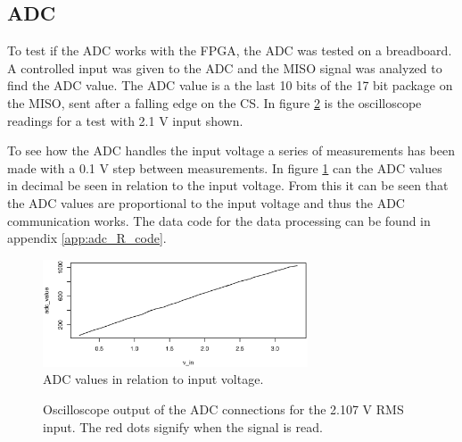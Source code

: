 \subsection{ADC}
To test if the ADC works with the FPGA, the ADC was tested on a breadboard.
A controlled input was given to the ADC and the MISO signal was analyzed to find the ADC value.
The ADC value is a the last 10 bits of the 17 bit package on the MISO, sent after a falling edge on the CS.
In figure \ref{fig:scope_adc} is the oscilloscope readings for a test with 2.1 V input shown.

To see how the ADC handles the input voltage a series of measurements has been made with a 0.1 V step between measurements.
In figure \ref{fig:adc_values} can the ADC values in decimal be seen in relation to the input voltage.
From this it can be seen that the ADC values are proportional to the input voltage and thus the ADC communication works.
The data code for the data processing can be found in appendix \ref{app:adc_R_code}.

\begin{figure}[h]
 \centering
 \includegraphics[width=0.7\textwidth]{img/ADC_values}
 \caption{ADC values in relation to input voltage.}
 \label{fig:adc_values}
\end{figure}

\begin{figure}[h]
    \centering
    \caption[Oscilloscope measurements for ADC]
            {Oscilloscope output of the ADC connections for the 2.107 V RMS input. The red dots signify when the signal is read.}
            \label{fig:scope_adc}
\end{figure}
